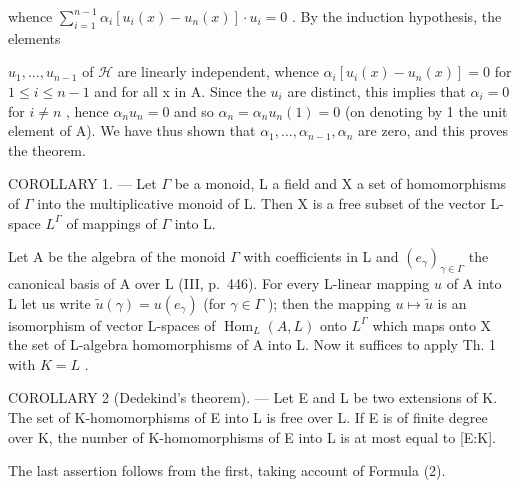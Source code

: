 whence \(\sum_{i=1}^{n-1} \alpha_i [u_i(x) - u_n(x)] \cdot u_i = 0\) . By the induction hypothesis, the elements

\(u_{1}, \ldots, u_{n-1}\) of \(\mathscr{H}\) are linearly independent, whence \(\alpha_{i}[u_{i}(x) - u_{n}(x)] = 0\) for \(1 \leqslant i \leqslant n-1\) and for all x in A. Since the \(u_{i}\) are distinct, this implies that \(\alpha_{i} = 0\) for \(i \neq n\) , hence \(\alpha_{n}u_{n} = 0\) and so \(\alpha_{n} = \alpha_{n}u_{n}(1) = 0\) (on denoting by 1 the unit element of A). We have thus shown that \(\alpha_{1}, \ldots, \alpha_{n-1}, \alpha_{n}\) are zero, and this proves the theorem.

COROLLARY 1. --- Let \(\Gamma\) be a monoid, L a field and X a set of homomorphisms of \(\Gamma\) into the multiplicative monoid of L. Then X is a free subset of the vector L-space \(L^{\Gamma}\) of mappings of \(\Gamma\) into L.

Let A be the algebra of the monoid \(\Gamma\) with coefficients in L and \((e_{\gamma})_{\gamma \in \Gamma}\) the canonical basis of A over L (III, p.~446). For every L-linear mapping \(u\) of A into L let us write \(\tilde{u}(\gamma) = u(e_{\gamma})\) (for \(\gamma \in \Gamma\) ); then the mapping \(u \mapsto \tilde{u}\) is an isomorphism of vector L-spaces of \(\operatorname{Hom}_{L}(A, L)\) onto \(L^{\Gamma}\) which maps onto X the set of L-algebra homomorphisms of A into L. Now it suffices to apply Th. 1 with \(K = L\) .

COROLLARY 2 (Dedekind's theorem). --- Let E and L be two extensions of K. The set of K-homomorphisms of E into L is free over L. If E is of finite degree over K, the number of K-homomorphisms of E into L is at most equal to {[}E:K{]}.

The last assertion follows from the first, taking account of Formula (2).

